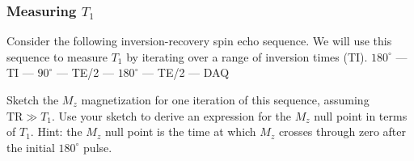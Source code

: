 \newpage
\subsubsection{Measuring $T_1$} \label{sec:T1}

Consider the following inversion-recovery spin echo sequence. We will use this sequence to measure $T_1$ by iterating over a range of inversion times (TI). \newline
\newline
$180^{\circ}$ --- TI --- $90^{\circ}$ --- TE/2 --- $180^{\circ}$ --- TE/2 --- DAQ
\newline

\color{red}
Sketch the $M_z$ magnetization for one iteration of this sequence, assuming $\text{TR} \gg T_1$. Use your sketch to derive an expression for the $M_z$ null point in terms of $T_1$. Hint: the $M_z$ null point is the time at which $M_z$ crosses through zero after the initial $180^{\circ}$ pulse. 
\color{black}

